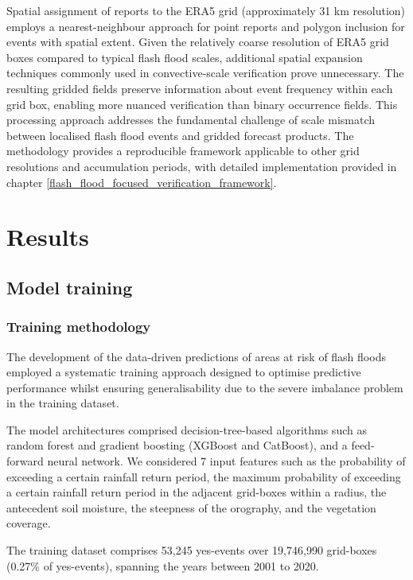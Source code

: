 Spatial assignment of reports to the ERA5 grid (approximately 31 km resolution) employs a nearest-neighbour approach for point reports and polygon inclusion for events with spatial extent. Given the relatively coarse resolution of ERA5 grid boxes compared to typical flash flood scales, additional spatial expansion techniques commonly used in convective-scale verification prove unnecessary. The resulting gridded fields preserve information about event frequency within each grid box, enabling more nuanced verification than binary occurrence fields.
This processing approach addresses the fundamental challenge of scale mismatch between localised flash flood events and gridded forecast products. The methodology provides a reproducible framework applicable to other grid resolutions and accumulation periods, with detailed implementation provided in chapter \ref{flash_flood_focused_verification_framework}.



\section{Results}
\label{data_driven_flash_floods_short_medium_range_results}


\subsection{Model training}

\subsubsection{Training methodology}

The development of the data-driven predictions of areas at risk of flash floods employed a systematic training approach designed to optimise predictive performance whilst ensuring generalisability due to the severe imbalance problem in the training dataset. 

The model architectures comprised decision-tree-based algorithms such as random forest and gradient boosting (XGBoost and CatBoost), and a feed-forward neural network. We considered 7 input features such as the probability of exceeding a certain rainfall return period, the maximum probability of exceeding a certain rainfall return period in the adjacent grid-boxes within a radius, the antecedent soil moisture, the steepness of the orography, and the vegetation coverage. 

The training dataset comprises 53,245 yes-events over 19,746,990 grid-boxes (0.27\% of yes-events), spanning the years between 2001 to 2020. 

